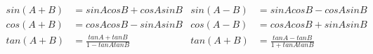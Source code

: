 \documentclass{article}
\begin{document}
\begin{flushleft}
\begin{align*}
sin(A+B)&=sinAcosB+cosAsinB & sin(A-B)&=sinAcosB-cosAsinB\\
cos(A+B)&=cosAcosB-sinAsinB & cos(A-B)&=cosAcosB+sinAsinB\\
tan(A+B)&=\frac{tanA+tanB}{1-tanAtanB} & tan(A+B)&=\frac{tanA-tanB}{1+tanAtanB}\\

\end{align*}
\end{flushleft}
\end{document}

